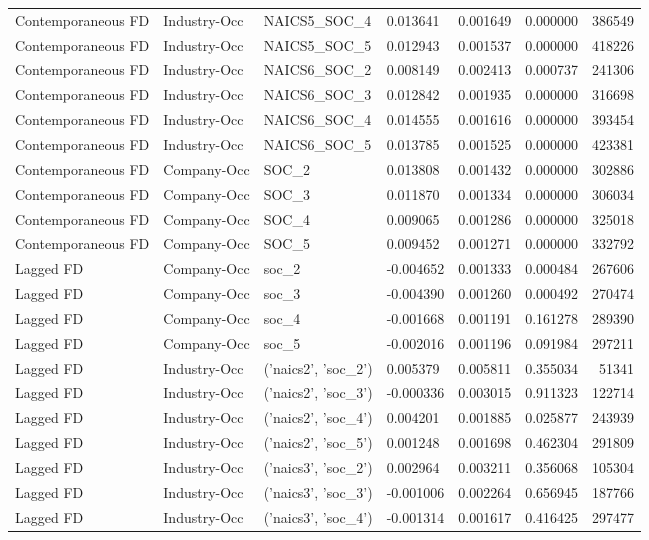 \begin{table}
\begin{tabular}{llllrrr}
Contemporaneous FD & Industry-Occ & NAICS5_SOC_4 & 0.013641 & 0.001649 & 0.000000 & 386549 \\
Contemporaneous FD & Industry-Occ & NAICS5_SOC_5 & 0.012943 & 0.001537 & 0.000000 & 418226 \\
Contemporaneous FD & Industry-Occ & NAICS6_SOC_2 & 0.008149 & 0.002413 & 0.000737 & 241306 \\
Contemporaneous FD & Industry-Occ & NAICS6_SOC_3 & 0.012842 & 0.001935 & 0.000000 & 316698 \\
Contemporaneous FD & Industry-Occ & NAICS6_SOC_4 & 0.014555 & 0.001616 & 0.000000 & 393454 \\
Contemporaneous FD & Industry-Occ & NAICS6_SOC_5 & 0.013785 & 0.001525 & 0.000000 & 423381 \\
Contemporaneous FD & Company-Occ & SOC_2 & 0.013808 & 0.001432 & 0.000000 & 302886 \\
Contemporaneous FD & Company-Occ & SOC_3 & 0.011870 & 0.001334 & 0.000000 & 306034 \\
Contemporaneous FD & Company-Occ & SOC_4 & 0.009065 & 0.001286 & 0.000000 & 325018 \\
Contemporaneous FD & Company-Occ & SOC_5 & 0.009452 & 0.001271 & 0.000000 & 332792 \\
Lagged FD & Company-Occ & soc_2 & -0.004652 & 0.001333 & 0.000484 & 267606 \\
Lagged FD & Company-Occ & soc_3 & -0.004390 & 0.001260 & 0.000492 & 270474 \\
Lagged FD & Company-Occ & soc_4 & -0.001668 & 0.001191 & 0.161278 & 289390 \\
Lagged FD & Company-Occ & soc_5 & -0.002016 & 0.001196 & 0.091984 & 297211 \\
Lagged FD & Industry-Occ & ('naics2', 'soc_2') & 0.005379 & 0.005811 & 0.355034 & 51341 \\
Lagged FD & Industry-Occ & ('naics2', 'soc_3') & -0.000336 & 0.003015 & 0.911323 & 122714 \\
Lagged FD & Industry-Occ & ('naics2', 'soc_4') & 0.004201 & 0.001885 & 0.025877 & 243939 \\
Lagged FD & Industry-Occ & ('naics2', 'soc_5') & 0.001248 & 0.001698 & 0.462304 & 291809 \\
Lagged FD & Industry-Occ & ('naics3', 'soc_2') & 0.002964 & 0.003211 & 0.356068 & 105304 \\
Lagged FD & Industry-Occ & ('naics3', 'soc_3') & -0.001006 & 0.002264 & 0.656945 & 187766 \\
Lagged FD & Industry-Occ & ('naics3', 'soc_4') & -0.001314 & 0.001617 & 0.416425 & 297477 \\

\end{tabular}
\end{table}
